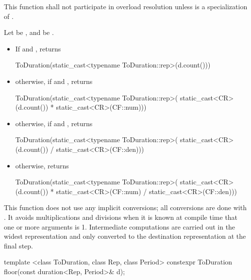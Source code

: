 \begin{itemdescr}
\pnum
\remarks This function shall not participate in overload resolution
unless  is a specialization of .

\pnum
\returns Let  be , and  be  .
\begin{itemize}
\item If  and , returns
\begin{codeblock}
ToDuration(static_cast<typename ToDuration::rep>(d.count()))
\end{codeblock}

\item otherwise, if  and , returns
\begin{codeblock}
ToDuration(static_cast<typename ToDuration::rep>(
  static_cast<CR>(d.count()) * static_cast<CR>(CF::num)))
\end{codeblock}

\item otherwise, if  and , returns
\begin{codeblock}
ToDuration(static_cast<typename ToDuration::rep>(
  static_cast<CR>(d.count()) / static_cast<CR>(CF::den)))
\end{codeblock}

\item otherwise, returns
\begin{codeblock}
ToDuration(static_cast<typename ToDuration::rep>(
  static_cast<CR>(d.count()) * static_cast<CR>(CF::num) / static_cast<CR>(CF::den)))
\end{codeblock}
\end{itemize}

\realnotes This function does not use any implicit conversions; all conversions
are done with . It avoids multiplications and divisions when
it is known at compile time that one or more arguments is 1. Intermediate
computations are carried out in the widest representation and only converted to
the destination representation at the final step.
\end{itemdescr}

%
%
\begin{itemdecl}
template <class ToDuration, class Rep, class Period>
  constexpr ToDuration floor(const duration<Rep, Period>& d);
\end{itemdecl}

